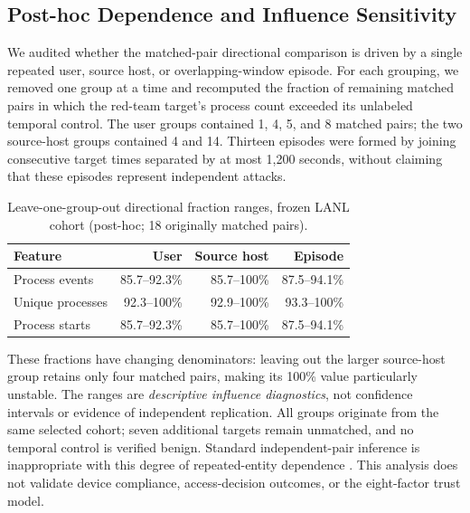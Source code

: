 \subsection{Post-hoc Dependence and Influence Sensitivity}
We audited whether the matched-pair directional comparison is driven
by a single repeated user, source host, or overlapping-window episode.
For each grouping, we removed one group at a time and recomputed the
fraction of remaining matched pairs in which the red-team target's
process count exceeded its unlabeled temporal control. The user groups
contained 1, 4, 5, and 8 matched pairs; the two source-host groups
contained 4 and 14. Thirteen episodes were formed by joining
consecutive target times separated by at most 1,200 seconds, without
claiming that these episodes represent independent attacks.

\begin{table}[ht]
\centering
\caption{Leave-one-group-out directional fraction ranges, frozen LANL cohort (post-hoc; 18 originally matched pairs).}
\label{tab:lanl-group-influence}
\begin{tabular}{lrrr}
\toprule
Feature & User & Source host & Episode \\
\midrule
Process events & 85.7--92.3\% & 85.7--100\% & 87.5--94.1\% \\
Unique processes & 92.3--100\% & 92.9--100\% & 93.3--100\% \\
Process starts & 85.7--92.3\% & 85.7--100\% & 87.5--94.1\% \\
\bottomrule
\end{tabular}
\end{table}

These fractions have changing denominators: leaving out the larger
source-host group retains only four matched pairs, making its 100\%
value particularly unstable. The ranges are \emph{descriptive
influence diagnostics}, not confidence intervals or evidence of
independent replication. All groups originate from the same selected
cohort; seven additional targets remain unmatched, and no temporal
control is verified benign. Standard independent-pair inference is
inappropriate with this degree of repeated-entity dependence
\cite{cameron2015cluster}. This analysis does not validate device
compliance, access-decision outcomes, or the eight-factor trust model.
